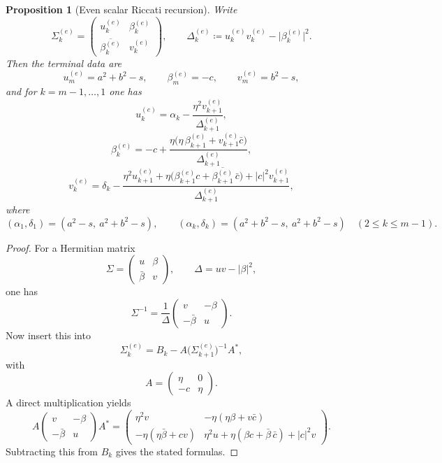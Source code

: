\documentclass[11pt]{article}
\newtheorem{proposition}[lemma]{Proposition}
\begin{document}
\begin{proposition}[Even scalar Riccati recursion]\label{prop:even-scalar}
Write
\[
\Sigma_k^{(e)}=
\begin{pmatrix}
u_k^{(e)} & \beta_k^{(e)}\\
\overline{\beta_k^{(e)}} & v_k^{(e)}
\end{pmatrix},
\qquad
\Delta_k^{(e)}\coloneqq
u_k^{(e)}v_k^{(e)}-\bigl|\beta_k^{(e)}\bigr|^2.
\]
Then the terminal data are
\[
u_m^{(e)}=a^2+b^2-s,
\qquad
\beta_m^{(e)}=-c,
\qquad
v_m^{(e)}=b^2-s,
\]
and for \(k=m-1,\dots,1\) one has
\[
u_k^{(e)}
=
\alpha_k-\frac{\eta^2 v_{k+1}^{(e)}}{\Delta_{k+1}^{(e)}},
\]
\[
\beta_k^{(e)}
=
-c+\frac{\eta\bigl(\eta\,\beta_{k+1}^{(e)}+v_{k+1}^{(e)}\bar c\bigr)}
{\Delta_{k+1}^{(e)}},
\]
\[
v_k^{(e)}
=
\delta_k-\frac{
\eta^2 u_{k+1}^{(e)}
+\eta\bigl(\beta_{k+1}^{(e)}c+\overline{\beta_{k+1}^{(e)}}\,\bar c\bigr)
+|c|^2 v_{k+1}^{(e)}
}{\Delta_{k+1}^{(e)}},
\]
where
\[
(\alpha_1,\delta_1)=(a^2-s,\ a^2+b^2-s),
\qquad
(\alpha_k,\delta_k)=(a^2+b^2-s,\ a^2+b^2-s)
\quad (2\le k\le m-1).
\]
\end{proposition}

\begin{proof}
For a Hermitian matrix
\[
\Sigma=
\begin{pmatrix}
u & \beta\\
\bar\beta & v
\end{pmatrix},
\qquad
\Delta=uv-|\beta|^2,
\]
one has
\[
\Sigma^{-1}
=
\frac1\Delta
\begin{pmatrix}
v & -\beta\\
-\bar\beta & u
\end{pmatrix}.
\]
Now insert this into
\[
\Sigma_k^{(e)}=B_k-A\bigl(\Sigma_{k+1}^{(e)}\bigr)^{-1}A^*,
\]
with
\[
A=
\begin{pmatrix}
\eta & 0\\
-c & \eta
\end{pmatrix}.
\]
A direct multiplication yields
\[
A
\begin{pmatrix}
v & -\beta\\
-\bar\beta & u
\end{pmatrix}
A^*
=
\begin{pmatrix}
\eta^2 v &
-\eta(\eta\beta+v\bar c)\\[0.4ex]
-\eta(\eta\bar\beta+cv) &
\eta^2u+\eta(\beta c+\bar\beta\,\bar c)+|c|^2v
\end{pmatrix}.
\]
Subtracting this from \(B_k\) gives the stated formulas.
\end{proof}
\end{document}
